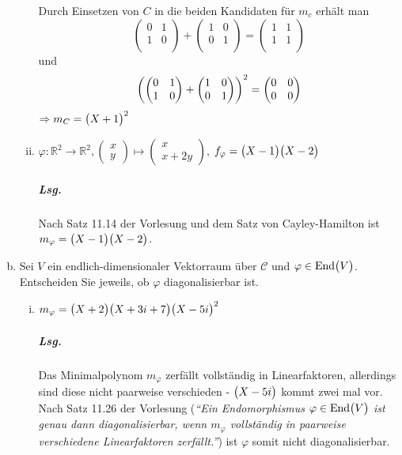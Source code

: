 \documentclass{scrreprt}
\newcommand{\End}{\text{End}}
\begin{document}
\begin{enumerate}[(a)]
\begin{enumerate}[(i)]
    Durch Einsetzen von $C$ in die beiden Kandidaten für $m_c$ erhält man
    \[
      \begin{pmatrix}
        0 & 1 \\
        1 & 0 \\
      \end{pmatrix} + \begin{pmatrix}
        1 & 0 \\
        0 & 1 \\
      \end{pmatrix} = \begin{pmatrix}
        1 & 1 \\
        1 & 1 \\
      \end{pmatrix}
    \]
    und
    \[
      \qty(\begin{pmatrix}
        0 & 1 \\
        1 & 0 \\
      \end{pmatrix} + \begin{pmatrix}
        1 & 0 \\
        0 & 1 \\
      \end{pmatrix})^2 = \begin{pmatrix}
        0 & 0 \\
        0 & 0 \\
      \end{pmatrix}
    \]
    $\Rightarrow m_C = \qty\big(X + 1)^2$

  \item $\varphi \colon \mathbb{R}^2 \to \mathbb{R}^2,
    \begin{pmatrix}x\\y\end{pmatrix} \mapsto
    \begin{pmatrix}x\\x + 2y\end{pmatrix}$,
    $f_{\varphi} = \qty\big(X - 1)\qty\big(X - 2)$

    \subparagraph{Lsg.} Nach Satz 11.14 der Vorlesung und dem Satz von
    Cayley-Hamilton ist $m_{\varphi} = \qty\big(X - 1)\qty\big(X - 2)$.
  \end{enumerate}

\item Sei $V$ ein endlich-dimensionaler Vektorraum über $\mathcal{C}$ und
  $\varphi \in \End\qty\big(V)$.
  Entscheiden Sie jeweils, ob $\varphi$ diagonalisierbar ist.
  \begin{enumerate}[(i)]
  \item $m_{\varphi} = \qty\big(X + 2)\qty\big(X + 3i + 7)\qty\big(X - 5i)^2$
    \subparagraph{Lsg.} Das Minimalpolynom $m_{\varphi}$ zerfällt vollständig in
    Linearfaktoren, allerdings sind diese nicht paarweise verschieden -
    $\qty\big(X - 5i)$ kommt zwei mal vor.
    Nach Satz 11.26 der Vorlesung (\emph{``Ein Endomorphismus
      $\varphi \in \End\qty\big(V)$ ist genau dann diagonalisierbar, wenn
      $m_{\varphi}$ vollständig in paarweise verschiedene Linearfaktoren
      zerfällt.''}) ist $\varphi$ somit nicht diagonalisierbar.


\end{enumerate}
\end{enumerate}
\end{document}
